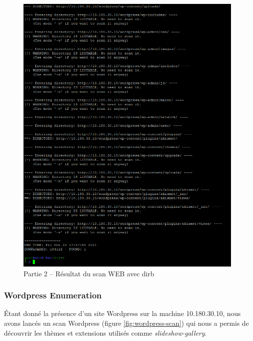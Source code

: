 \documentclass[french,paper=a4,oneside,captions=tableheading]{article}
\begin{document}
\begin{figure}[H]\ContinuedFloat
    \centering
    \includegraphics[width=16cm]{images/Secu_Offensive_39.png}
    \caption{Partie 2 -- Résultat du scan WEB avec dirb}
    \label{fig:dirb}
\end{figure}



\subsubsection{Wordpress Enumeration}

Étant donné la présence d'un site Wordpress sur la machine 10.180.30.10, nous avons lancés un scan Wordpress (figure \ref{fig:wordpress-scan}) qui nous a permis de découvrir les thèmes et extensions utilisés comme \textit{slideshow-gallery}.
\end{document}
